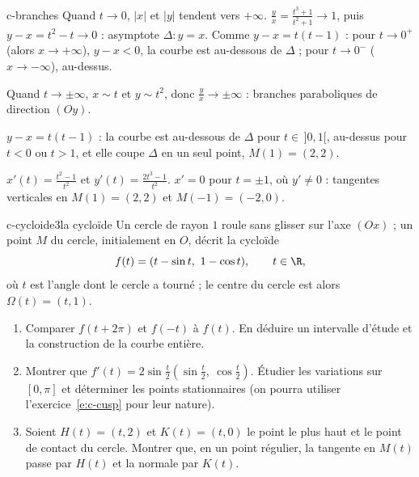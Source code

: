 \begin{corrige}{c-branches}
 Quand $t\to0$, $|x|$ et $|y|$ tendent vers $+\infty$. $\frac yx=\frac{t^3+1}{t^2+1}\to1$, puis $y-x=t^2-t\to0$ : asymptote $\Delta:y=x$. Comme $y-x=t(t-1)$ : pour $t\to0^+$ (alors $x\to+\infty$), $y-x<0$, la courbe est au-dessous de $\Delta$ ; pour $t\to0^-$ ($x\to-\infty$), au-dessus.

 Quand $t\to\pm\infty$, $x\sim t$ et $y\sim t^2$, donc $\frac yx\to\pm\infty$ : branches paraboliques de direction $(Oy)$.

 $y-x=t(t-1)$ : la courbe est au-dessous de $\Delta$ pour $t\in\,]0,1[$, au-dessus pour $t<0$ ou $t>1$, et elle coupe $\Delta$ en un seul point, $M(1)=(2,2)$.

 $x'(t)=\frac{t^2-1}{t^2}$ et $y'(t)=\frac{2t^3-1}{t^2}$. $x'=0$ pour $t=\pm1$, où $y'\neq0$ : tangentes verticales en $M(1)=(2,2)$ et $M(-1)=(-2,0)$.
\end{corrige}

\begin{exo}{c-cycloide}{3}{la cycloïde}
Un cercle de rayon $1$ roule sans glisser sur l'axe $(Ox)$ ; un point $M$ du cercle, initialement en $O$, décrit la cycloïde
\[f(t)=(t-\sin t,\ 1-\cos t),\qquad t\in\R,\]
où $t$ est l'angle dont le cercle a tourné ; le centre du cercle est alors $\Omega(t)=(t,1)$.
\begin{enumerate}
\item Comparer $f(t+2\pi)$ et $f(-t)$ à $f(t)$. En déduire un intervalle d'étude et la construction de la courbe entière.
\item Montrer que $f'(t)=2\sin\frac t2\left(\sin\frac t2,\ \cos\frac t2\right)$. Étudier les variations sur $[0,\pi]$ et déterminer les points stationnaires (on pourra utiliser l'exercice~\ref{e:c-cusp} pour leur nature).
\item Soient $H(t)=(t,2)$ et $K(t)=(t,0)$ le point le plus haut et le point de contact du cercle. Montrer que, en un point régulier, la tangente en $M(t)$ passe par $H(t)$ et la normale par $K(t)$.
\end{enumerate}
\end{exo}


